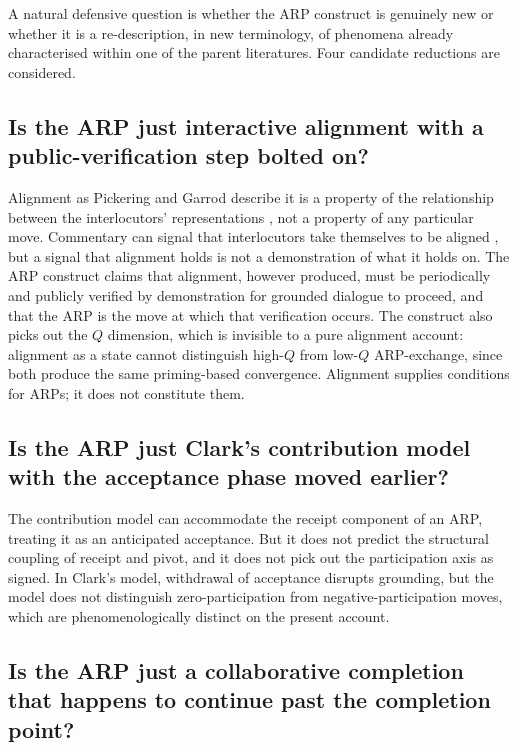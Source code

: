 A natural defensive question is whether the ARP construct is genuinely new or whether it is a re-description, in new terminology, of phenomena already characterised within one of the parent literatures. Four candidate reductions are considered.

\subsection{Is the ARP just interactive alignment with a public-verification step bolted on?}

Alignment as Pickering and Garrod describe it is a property of the relationship between the interlocutors' representations \citep{PickeringGarrod2021}, not a property of any particular move. Commentary can signal that interlocutors take themselves to be aligned \citep{PickeringGarrod2021}, but a signal that alignment holds is not a demonstration of what it holds on. The ARP construct claims that alignment, however produced, must be periodically and publicly verified by demonstration for grounded dialogue to proceed, and that the ARP is the move at which that verification occurs. The construct also picks out the $Q$ dimension, which is invisible to a pure alignment account: alignment as a state cannot distinguish high-$Q$ from low-$Q$ ARP-exchange, since both produce the same priming-based convergence. Alignment supplies conditions for ARPs; it does not constitute them.

\subsection{Is the ARP just Clark's contribution model with the acceptance phase moved earlier?}

The contribution model can accommodate the receipt component of an ARP, treating it as an anticipated acceptance. But it does not predict the structural coupling of receipt and pivot, and it does not pick out the participation axis as signed. In Clark's model, withdrawal of acceptance disrupts grounding, but the model does not distinguish zero-participation from negative-participation moves, which are phenomenologically distinct on the present account.

\subsection{Is the ARP just a collaborative completion that happens to continue past the completion point?}

